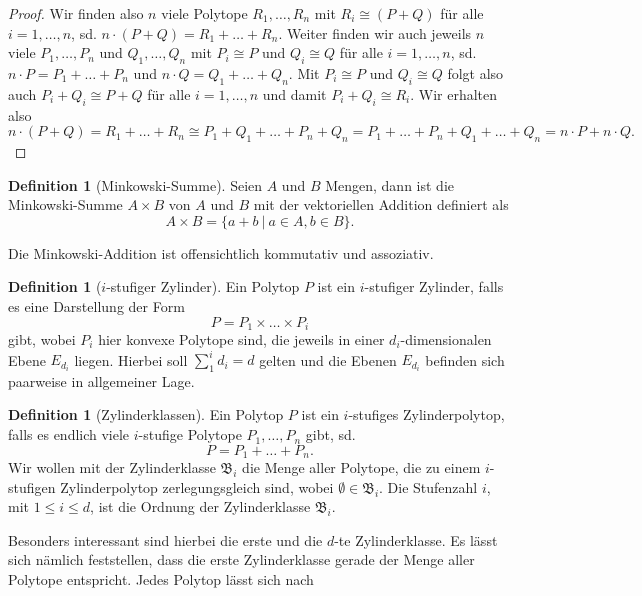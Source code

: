 \documentclass[11pt,titlepage]{article}
\theoremstyle{definition}
\newtheorem{definition}[theorem]{Definition}
\theoremstyle{remark}
\begin{document}
	\begin{proof}
		Wir finden also $n$ viele Polytope $R_1,\ldots,R_n$ mit 
		$R_i\cong (P+Q)$ für alle $i=1,\ldots,n$, sd. 
		$n\cdot(P+Q)=R_1+\ldots+R_n$. Weiter finden wir auch jeweils $n$ viele 
		$P_1,\ldots,P_n$ und $Q_1,\ldots,Q_n$ mit $P_i\cong P$ und $Q_i\cong Q$ 
		für alle $i=1,\ldots,n$, sd. $n\cdot P=P_1+\ldots+P_n$ und 
		$n\cdot Q=Q_1+\ldots+Q_n$. Mit $P_i\cong P$ und $Q_i\cong Q$ folgt 
		also auch $P_i+Q_i\cong P+Q$ für alle $i=1,\ldots,n$ und damit 
		$P_i+Q_i\cong R_i$. Wir erhalten also
		\[n\cdot(P+Q)=R_1+\ldots+R_n\cong P_1+Q_1+\ldots+P_n+Q_n=P_1+\ldots+P_n+Q_1+\ldots+Q_n=n\cdot P+n\cdot Q.\]
	\end{proof}
	
	\begin{definition}[Minkowski-Summe]
		Seien $A$ und $B$ Mengen, dann ist die Minkowski-Summe $A\times B$ 
		von $A$ und $B$ mit der vektoriellen Addition definiert als
		\[A\times B=\left.\{a+b\ \right\vert\ a\in A,b\in B\}.\]
	\end{definition}
	
	Die Minkowski-Addition ist offensichtlich kommutativ und assoziativ. 
	
	\begin{definition}[$i$-stufiger Zylinder]
		Ein Polytop $P$ ist ein $i$-stufiger Zylinder, falls es eine Darstellung 
		der Form
		\[P=P_1 \times\ldots\times P_i\]
		gibt, wobei $P_i$ hier konvexe Polytope sind, die jeweils in einer $d_i$-dimensionalen Ebene $E_{d_i}$ liegen. Hierbei soll $\sum_1^i d_i =d$
		gelten und die Ebenen $E_{d_i}$ befinden sich paarweise in allgemeiner Lage.
	\end{definition}
	
	\begin{definition}[Zylinderklassen]
		Ein Polytop $P$ ist ein $i$-stufiges Zylinderpolytop, falls 
		es endlich viele $i$-stufige Polytope $P_1,\ldots,P_n$ gibt, sd.
		\[P=P_1+\ldots+P_n.\]
		Wir wollen mit der Zylinderklasse $\mathfrak{B}_i$ die Menge aller 
		Polytope, die zu einem $i$-stufigen Zylinderpolytop zerlegungsgleich 
		sind, wobei $\emptyset\in\mathfrak{B}_i$. Die Stufenzahl $i$, 
		mit $1\leq i\leq  d$, ist die Ordnung der Zylinderklasse $\mathfrak{B}_i$.
	\end{definition}

	Besonders interessant sind hierbei die erste und die $d$-te Zylinderklasse. 
	Es lässt sich nämlich feststellen, dass die erste Zylinderklasse gerade 
	der Menge aller Polytope entspricht. Jedes Polytop lässt sich nach 
	
\end{document}
